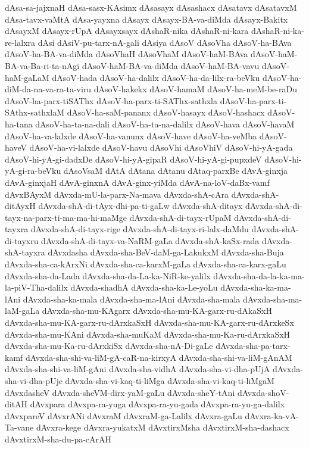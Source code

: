 {dAsa-sa-jajxnaH
dAsa-sasx-KAsimx
dAsasayx
dAsashacx
dAsatavx
dAsatavxM
dAsa-tavx-vaMtA
dAsa-yayxna
dAsayx
dAsayx-BA-va-diMda
dAsayx-Bakitx
dAsayxM
dAsayx-rUpA
dAsayxsayx
dAshaR-nika
dAshaR-ni-kara
dAshaR-ni-ka-re-lalxra
dAsi
dAsiV-pu-tarx-nA-gali
dAsiya
dAsoV
dAsoVha
dAsoV-ha-BAva
dAsoV-ha-BA-va-diMda
dAsoVhaH
dAsoVhaM
dAsoV-haM-BAva
dAsoV-haM-BA-va-Ba-ri-ta-nAgi
dAsoV-haM-BA-va-diMda
dAsoV-haM-BA-vavu
dAsoV-haM-gaLaM
dAsoV-hada
dAsoV-ha-dalilx
dAsoV-ha-da-lilx-ra-beVku
dAsoV-ha-diM-da-na-va-ra-ta-viru
dAsoV-hakekx
dAsoV-hamaM
dAsoV-ha-meM-be-raDu
dAsoV-ha-parx-tiSAThx
dAsoV-ha-parx-ti-SAThx-sathxla
dAsoV-ha-parx-ti-SAthx-sathxlaM
dAsoV-ha-saM-pananx
dAsoV-hasayx
dAsoV-hashacx
dAsoV-ha-tana
dAsoV-ha-ta-na-dali
dAsoV-ha-ta-na-dalilx
dAsoV-hava
dAsoV-havaM
dAsoV-ha-va-lalxde
dAsoV-ha-vanunx
dAsoV-have
dAsoV-ha-veMba
dAsoV-haveV
dAsoV-ha-vi-lalxde
dAsoV-havu
dAsoVhi
dAsoVhiV
dAsoV-hi-yA-gada
dAsoV-hi-yA-gi-dadxDe
dAsoV-hi-yA-gipaR
dAsoV-hi-yA-gi-pupxdeV
dAsoV-hi-yA-gi-ra-beVku
dAsoVsaM
dAtA
dAtana
dAtanu
dAtaq-parxBe
dAvA-ginxja
dAvA-ginxjaH
dAvA-ginxnA
dAvA-ginx-yiMda
dAvA-na-loV-daBx-vamf
dAvxBAyxM
dAvxda-mU-la-parx-Na-mava
dAvxda-shA-cAra
dAvxda-shA-ditAyxH
dAvxda-shA-di-tAyx-dhi-pa-ti-gaLw
dAvxda-shA-ditayx
dAvxda-shA-di-tayx-na-parx-ti-ma-ma-hi-maMge
dAvxda-shA-di-tayx-rUpaM
dAvxda-shA-di-tayxra
dAvxda-shA-di-tayx-rige
dAvxda-shA-di-tayx-ri-lalx-daMdu
dAvxda-shA-di-tayxru
dAvxda-shA-di-tayx-va-NaRM-gaLa
dAvxda-shA-kaSx-rada
dAvxda-shA-tayxra
dAvxdasha
dAvxda-sha-BeV-daM-ga-LakukxM
dAvxda-sha-Buja
dAvxda-sha-ca-kArxNi
dAvxda-sha-ca-karxM-gaLa
dAvxda-sha-ca-karx-gaLu
dAvxda-sha-da-Lada
dAvxda-sha-da-La-ka-NiR-ke-yalilx
dAvxda-sha-da-la-ka-ma-la-piV-Tha-dalilx
dAvxda-shadhA
dAvxda-sha-ka-Le-yoLu
dAvxda-sha-ka-ma-lAni
dAvxda-sha-ka-mala
dAvxda-sha-ma-lAni
dAvxda-sha-mala
dAvxda-sha-ma-laM-gaLa
dAvxda-sha-mu-KAgarx
dAvxda-sha-mu-KA-garx-ru-dAkaSxH
dAvxda-sha-mu-KA-garx-ru-dArxkaSxH
dAvxda-sha-mu-KA-garx-ru-dArxkeSx
dAvxda-sha-mu-KAni
dAvxda-sha-muKaM
dAvxda-sha-mu-Ka-ru-dArxkaSxH
dAvxda-sha-mu-Ka-ru-dArxkiSx
dAvxda-sha-nA-Di-gaLe
dAvxda-sha-pa-tarx-kamf
dAvxda-sha-shi-va-liM-gA-caR-na-kirxyA
dAvxda-sha-shi-va-liM-gAnAM
dAvxda-sha-shi-va-liM-gAni
dAvxda-sha-vidhA
dAvxda-sha-vi-dha-pUjA
dAvxda-sha-vi-dha-pUje
dAvxda-sha-vi-kaq-ti-liMga
dAvxda-sha-vi-kaq-ti-liMgaM
dAvxdasheV
dAvxda-sheVM-dirx-yaM-gaLu
dAvxda-sheY-tAni
dAvxda-shoV-ditAH
dAvxpara
dAvxpa-ra-yuga
dAvxpa-ra-yu-gada
dAvxpa-ra-yu-ga-dalilx
dAvxpareV
dAvxrANi
dAvxraM
dAvxraM-ga-Lalilx
dAvxra-gaLu
dAvxra-ka-vA-Ta-vane
dAvxra-kege
dAvxra-yukatxM
dAvxtirxMsha
dAvxtirxM-sha-dashacx
dAvxtirxM-sha-du-pa-cArAH
}
